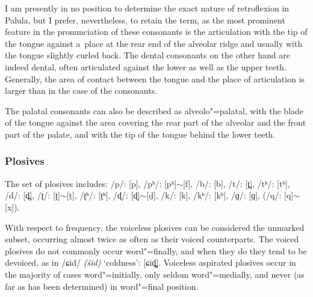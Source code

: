 


I am presently in no position to determine the exact nature of retroflexion in Palula, but I prefer, nevertheless, to retain the term, as the most prominent feature in the pronunciation of these consonants is the articulation with the tip of the tongue against a~place at the rear end of the alveolar ridge and usually with the tongue slightly curled back. The dental consonants on the other hand are indeed dental, often articulated against the lower as well as the upper teeth. Generally, the area of contact between the tongue and the place of articulation is larger than in the case of the  consonants.


The palatal consonants can also be described as alveolo"=palatal, with the blade of the tongue against the area covering the rear part of the alveolar and the front part of the palate, and with the tip of the tongue behind the lower teeth. 

\largerpage[2]
\subsubsection*{Plosives}
The set of plosives includes: /p/: [p], /pʰ/: [pʰ]$\sim$[f], /b/: [b], /t/: [t̪], /tʰ/: [tʰ], /d/: [d̪], /ʈ/: [ʈ]$\sim$[ṯ], /ʈʰ/: [ʈʰ], /ɖ/: [ɖ]$\sim$[ḏ], /k/: [k], /kʰ/: [kʰ], /ɡ/: [ɡ], (/q/: [q]$\sim$[x]).

With respect to frequency, the voiceless plosives can be considered the unmarked subset, occurring almost twice as often as their voiced counterparts. The voiced plosives do not commonly occur word"=finally, and when they do they tend to be devoiced, as in /ɕid/ \textit{(šid)} `coldness': [ɕid̪̥]. Voiceless aspirated plosives occur in the majority of cases word"=initially, only seldom word"=medially, and never (as far as has been determined) in word"=final position. 


